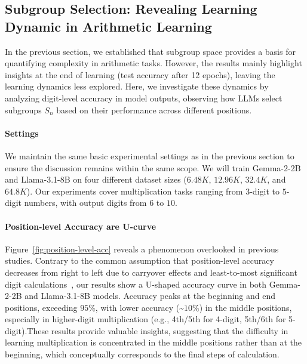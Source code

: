 \documentclass[11pt]{article}
\begin{document}
\subsection{Subgroup Selection: Revealing Learning Dynamic in Arithmetic Learning}
\label{sec:subgroup-selection}
In the previous section, we established that subgroup space provides a basis for quantifying complexity in arithmetic tasks. However, the results mainly highlight insights at the end of learning (test accuracy after 12 epochs), leaving the learning dynamics less explored. Here, we investigate these dynamics by analyzing digit-level accuracy in model outputs, observing how LLMs select subgroups $S_n$ based on their performance across different positions.

\paragraph{Settings}
We maintain the same basic experimental settings as in the previous section to ensure the discussion remains within the same scope. We will train Gemma-2-2B and Llama-3.1-8B on four different dataset sizes (\(6.48K\), \(12.96K\), \(32.4K\), and \(64.8K\)). Our experiments cover multiplication tasks ranging from $3$-digit to $5$-digit numbers, with output digits from $6$ to $10$.
\paragraph{Position-level Accuracy are U-curve}
Figure~\ref{fig:position-level-acc} reveals a phenomenon overlooked in previous studies. Contrary to the common assumption that position-level accuracy decreases from right to left due to carryover effects and least-to-most significant digit calculations~\citep{lee2023teachingarithmeticsmalltransformers,zhangli2024reversenumberdecodingorder}, our results show a U-shaped accuracy curve in both Gemma-2-2B and Llama-3.1-8B models. Accuracy peaks at the beginning and end positions, exceeding $95\%$, with lower accuracy (\textasciitilde$10\%$) in the middle positions, especially in higher-digit multiplication (e.g., 4th/5th for 4-digit, 5th/6th for 5-digit).These results provide valuable insights, suggesting that the difficulty in learning multiplication is concentrated in the middle positions rather than at the beginning, which conceptually corresponds to the final steps of calculation.
\end{document}
